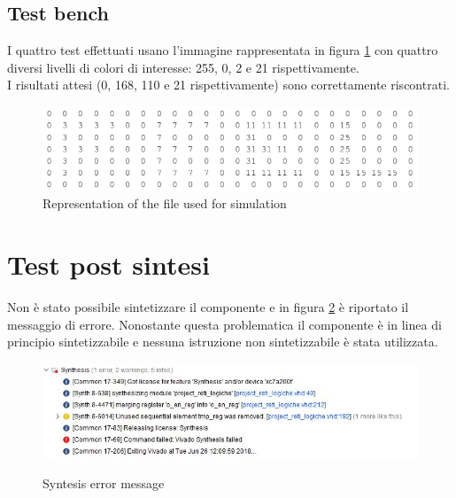 \subsection{Test bench}
I quattro test effettuati usano l'immagine rappresentata in figura \ref{file} con quattro diversi livelli di colori di interesse: 255, 0, 2 e 21 rispettivamente.\\
I risultati attesi (0, 168, 110 e 21 rispettivamente) sono correttamente riscontrati.\\

\begin{figure}
	\includegraphics[scale=0.5]{evaluation/File.png}
    \caption{Representation of the file used for simulation}
    \label{file}
\end{figure}

\section{Test post sintesi}
Non è stato possibile sintetizzare il componente e in figura \ref{error_message} è riportato il messaggio di errore. Nonostante questa problematica il componente è in linea di principio sintetizzabile e nessuna istruzione non sintetizzabile è stata utilizzata.

\begin{figure}
	\includegraphics[]{evaluation/error_message.JPG}
    \label{error_message}
    \caption{Syntesis error message}
\end{figure}

